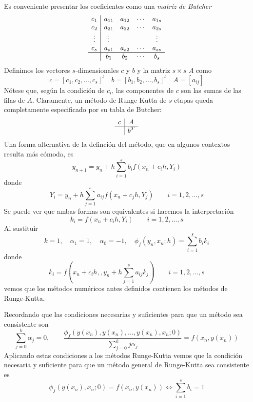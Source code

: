 Es conveniente presentar los coeficientes como una \textit{matriz de Butcher}
$$\begin{array}{c|cccc}
     c_1 & a_{11} & a_{12} & \cdots &  a_{1s} \\
     c_2 & a_{21} & a_{22} & \cdots &  a_{2s} \\ 
     \vdots & \vdots & &  & \vdots \\ 
     c_s & a_{s1} & a_{s2} & \cdots &  a_{ss} \\ \hline
     & b_1 & b_2 & \cdots & b_s
\end{array}$$
Definimos los vectores $s$-dimensionales $c$ y $b$ y la matriz $s\times s$ $A$ como
$$c=[c_1, c_2, \ldots, c_s]^t \quad b = [b_1, b_2, \ldots, b_s]^t \quad A = [a_{ij}]$$
Nótese que, según la condici\'on de $c_i$, las componentes de $c$ son las sumas de las filas de $A$. Claramente, un método de Runge-Kutta de $s$ etapas queda completamente especificado por su tabla de Butcher:
\begin{equation*}
    \begin{array}{c|c}
        c & A \\
        \hline
        & b^T
    \end{array}
\end{equation*}
Una forma alternativa de la definci\'on del m\'etodo, que en algunos contextos resulta más cómoda, es
$$ y_{n+1} = y_n + h \sum_{i=1}^{s} b_i f(x_n + c_i h, Y_i)$$
donde
$$ Y_i = y_n + h \sum_{j=1}^{s} a_{ij} f(x_n + c_j h, Y_j) \qquad i = 1, 2, \dots, s$$
Se puede ver que ambas formas son equivalentes si hacemos la interpretación
$$k_i = f(x_n + c_i h, Y_i) \qquad i = 1, 2, \dots, s$$
Al sustituir $$k = 1, \quad \alpha_1 = 1, \quad \alpha_0 = -1, \quad \phi_f(y_n, x_n; h) = \sum_{i=1}^{s} b_i k_i$$
donde
$$k_i = f\left(x_n + c_i h, , y_n + h \sum_{j=1}^{s} a_{ij} k_j\right) \qquad i = 1, 2, \dots, s$$
vemos que los m\'etodos num\'ericos antes definidos contienen los métodos de Runge-Kutta.

Recordando que las condiciones necesarias y suficientes para que un m\'etodo sea consistente son
$$\sum_{j=0}^{k} \alpha_j = 0, \qquad \frac{\phi_f(y(x_n), y(x_n), \dots, y(x_n), x_n; 0)}{\sum_{j=0}^{k} j \alpha_j} = f(x_n, y(x_n))$$
Aplicando estas condiciones a los m\'etodos Runge-Kutta vemos que la condición necesaria y suficiente para que un método general de Runge-Kutta sea consistente es
$$\phi_f(y(x_n), x_n; 0) = f(x_n, y(x_n)) \iff \sum_{i=1}^{s} b_i = 1$$

